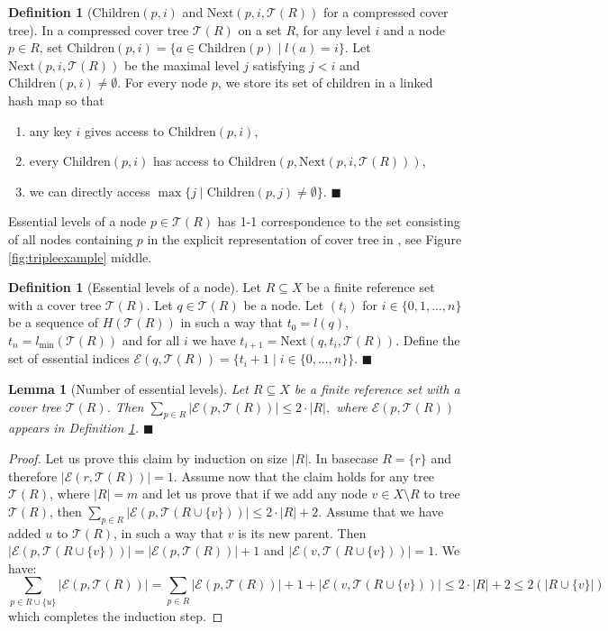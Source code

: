 \documentclass[a4paper,UKenglish,cleveref, autoref]{lipics-v2019}
\numberwithin{algocf}{section}
\theoremstyle{definition}
\newtheorem{dfn}[algocf]{Definition}
\theoremstyle{definition}
\theoremstyle{definition}
\theoremstyle{plain}
\newtheorem{lem}[algocf]{Lemma}
\newcommand{\Es}{\mathcal{E}}
\newcommand{\Child}{\mathrm{Children}}
\newcommand{\nxt}{\mathrm{Next}}
\newcommand{\T}{\mathcal{T}}
\newcommand{\bs}{\hfill $\blacksquare$}
\begin{document}
\begin{dfn}[$\Child(p,i)$ and $\nxt(p,i,\T(R))$ for a compressed cover tree]
 \label{dfn:implementation_compressed_cover_tree}
In a compressed cover tree $\T(R)$ on a set $R$, for any level $i$ and a node $p \in R$, set $\Child(p,i) = \{ a \in \Child(p) \mid l(a) = i \}$. 
Let $\nxt(p,i,\T(R))$ be the maximal level $j$ satisfying $j < i$ and $\Child(p,i) \neq \emptyset$. 
For every node $p$, we store its set of children in a linked hash map so that
 \begin{enumerate}[label=(\arabic*)]
     \item any key $i$ gives access to $\Child(p,i)$,
     \item every $\Child(p,i)$ has access to $\Child(p,\nxt(p,i, \T(R)))$,
     \item we can directly access $\max \{j \mid \Child(p,j) \neq \emptyset\}$.
     \bs
 \end{enumerate}
 \end{dfn}
 
 Essential levels of a node $p \in \T(R)$ has 1-1 correspondence to the set consisting of all nodes containing $p$ in the explicit representation of cover tree in \cite{beygelzimer2006cover}, see Figure \ref{fig:tripleexample} middle. 

\begin{dfn}[Essential levels of a node]
\label{dfn:essential_levels_node}
Let $R\subseteq X$ be a finite reference set with a cover tree $\T(R)$. Let $q \in \T(R)$ be a node. Let $(t_i)$ for 
$i \in \{0,1,...,n\}$ be a sequence of $H(\T(R))$ in such a way that $t_0 = l(q)$, $t_n = l_{\min}(\T(R))$ and for all $i$ we have $t_{i+1} = \nxt(q, t_{i}, \T(R))$. Define the set of essential indices $\Es(q,\T(R)) = \{ t_{i} + 1 \mid i \in \{0,...,n\} \}$.
\bs
\end{dfn}

\begin{lem}[Number of essential levels]
\label{lem:number_of_explicit_levels}
Let $R\subseteq X$ be a finite reference set with a cover tree $\T(R)$. Then 
$\sum_{p \in R}|\mathcal{E}(p,\T(R))| \leq 2 \cdot |R|,$
where $\mathcal{E}(p,\T(R))$ appears in Definition \ref{dfn:essential_levels_node}. \bs
\end{lem}
\begin{proof}
Let us prove this claim by induction on size $|R|$. In basecase $R = \{r\}$ and therefore $|\mathcal{E}(r,\T(R))| = 1$.
Assume now that the claim holds for any tree $\T(R)$, where $|R| = m$ and let us prove that if we add any node $v \in X \setminus R$ to tree $\T(R)$, then $\sum_{p \in R}|\mathcal{E}(p,\T(R \cup \{v\}))| \leq 2 \cdot |R| + 2$. Assume that we have added $u$ to $\T(R)$, in such a way that $v$ is its new parent. Then $|\mathcal{E}(p,\T(R \cup \{v\}))| = |\mathcal{E}(p,\T(R))| + 1 $ and $|\mathcal{E}(v,\T(R \cup \{v\}))| = 1$. We have:
$$ \sum_{p \in R \cup \{u\}}|\mathcal{E}(p,\T(R))| = \sum_{p \in R}|\mathcal{E}(p,\T(R))| + 1 + |\mathcal{E}(v,\T(R \cup \{v\}))| \leq 2\cdot |R| + 2 \leq 2(|R \cup \{v\}|) $$
which completes the induction step. 
\end{proof}
\end{document}
